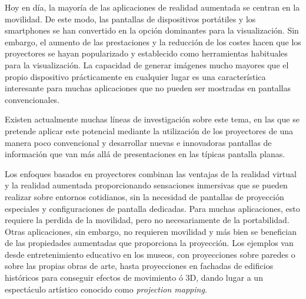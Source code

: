 
Hoy en día, la mayoría de las aplicaciones de realidad aumentada se centran en la movilidad. De este modo, las pantallas de dispositivos portátiles y los smartphones se han convertido en la opción dominantes para la visualización. Sin embargo, el aumento de las prestaciones y la reducción de los costes hacen que los proyectores se hayan popularizado y establecido como herramientas habituales para la visualización. La capacidad de generar imágenes mucho mayores que el propio dispositivo prácticamente en cualquier lugar es una característica interesante para muchas aplicaciones que no pueden ser mostradas en pantallas convencionales. 

Existen actualmente muchas líneas de investigación sobre este tema, en las que se pretende aplicar este potencial mediante la utilización de los proyectores de una manera poco convencional y desarrollar nuevas e innovadoras pantallas de información que van más allá de presentaciones en las típicas pantalla planas.
 
Los enfoques basados en proyectores combinan las ventajas de la realidad virtual y la realidad aumentada proporcionando sensaciones inmersivas que se pueden realizar sobre entornos cotidianos, sin la necesidad de pantallas de proyección especiales y configuraciones de pantalla dedicadas. Para muchas aplicaciones, esto requiere la perdida de la movilidad, pero no necesariamente de la portabilidad. Otras aplicaciones, sin embargo, no requieren movilidad y más bien se benefician de las propiedades aumentadas que proporciona la proyección. Los ejemplos van desde entretenimiento educativo en los museos, con proyecciones sobre paredes o sobre las propias obras de arte, hasta proyecciones en fachadas de edificios históricos para conseguir efectos de movimiento ó 3D, dando lugar a un espectáculo artístico conocido como \emph{projection mapping.}

